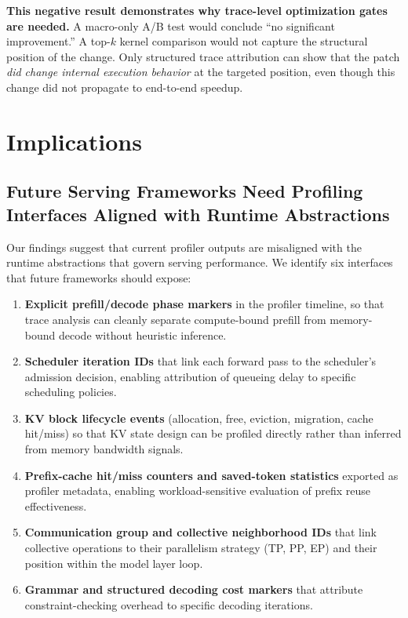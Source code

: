 \documentclass[conference]{IEEEtran}
\begin{document}
\textbf{This negative result demonstrates why trace-level optimization gates
are needed.} A macro-only A/B test would conclude ``no significant
improvement.'' A top-$k$ kernel comparison would not capture the structural
position of the change. Only structured trace attribution can show that the
patch \emph{did change internal execution behavior} at the targeted position,
even though this change did not propagate to end-to-end speedup.


\section{Implications}
\label{sec:implications}

\subsection{Future Serving Frameworks Need Profiling Interfaces Aligned with Runtime Abstractions}

Our findings suggest that current profiler outputs are misaligned with the
runtime abstractions that govern serving performance. We identify six
interfaces that future frameworks should expose:

\begin{enumerate}
\item \textbf{Explicit prefill/decode phase markers} in the profiler timeline,
so that trace analysis can cleanly separate compute-bound prefill from
memory-bound decode without heuristic inference.

\item \textbf{Scheduler iteration IDs} that link each forward pass to the
scheduler's admission decision, enabling attribution of queueing delay to
specific scheduling policies.

\item \textbf{KV block lifecycle events} (allocation, free, eviction,
migration, cache hit/miss) so that KV state design can be profiled directly
rather than inferred from memory bandwidth signals.

\item \textbf{Prefix-cache hit/miss counters and saved-token statistics}
exported as profiler metadata, enabling workload-sensitive evaluation of
prefix reuse effectiveness.

\item \textbf{Communication group and collective neighborhood IDs} that link
collective operations to their parallelism strategy (TP, PP, EP) and their
position within the model layer loop.

\item \textbf{Grammar and structured decoding cost markers} that attribute
constraint-checking overhead to specific decoding iterations.
\end{enumerate}
\end{document}
